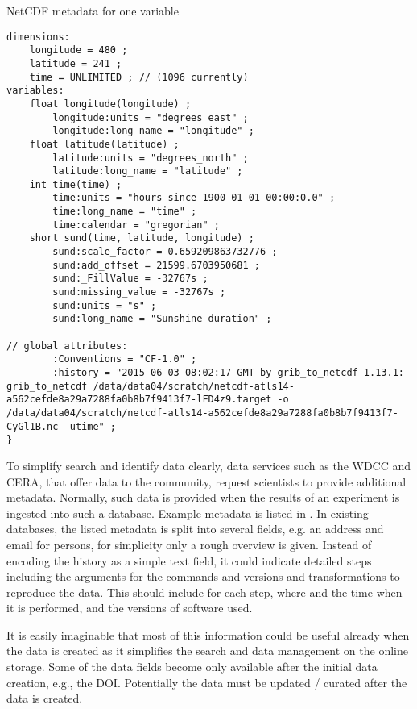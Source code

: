 \begin{tcbcode}[label={lst:NetCDF-data-map}]{NetCDF metadata for one variable}
\begin{lstlisting}
dimensions:
	longitude = 480 ;
	latitude = 241 ;
	time = UNLIMITED ; // (1096 currently)
variables:
	float longitude(longitude) ;
		longitude:units = "degrees_east" ;
		longitude:long_name = "longitude" ;
	float latitude(latitude) ;
		latitude:units = "degrees_north" ;
		latitude:long_name = "latitude" ;
	int time(time) ;
		time:units = "hours since 1900-01-01 00:00:0.0" ;
		time:long_name = "time" ;
		time:calendar = "gregorian" ;
	short sund(time, latitude, longitude) ;
		sund:scale_factor = 0.659209863732776 ;
		sund:add_offset = 21599.6703950681 ;
		sund:_FillValue = -32767s ;
		sund:missing_value = -32767s ;
		sund:units = "s" ;
		sund:long_name = "Sunshine duration" ;

// global attributes:
		:Conventions = "CF-1.0" ;
		:history = "2015-06-03 08:02:17 GMT by grib_to_netcdf-1.13.1: grib_to_netcdf /data/data04/scratch/netcdf-atls14-a562cefde8a29a7288fa0b8b7f9413f7-lFD4z9.target -o /data/data04/scratch/netcdf-atls14-a562cefde8a29a7288fa0b8b7f9413f7-CyGl1B.nc -utime" ;
}
\end{lstlisting}
\end{tcbcode}

To simplify search and identify data clearly, data services such as the WDCC and CERA, that offer data to the community, request scientists to provide additional metadata.
Normally, such data is provided when the results of an experiment is ingested into such a database.
Example metadata is listed in .
In existing databases, the listed metadata is split into several fields, e.g. an address and email for persons, for simplicity only a rough overview is given.
Instead of encoding the history as a simple text field, it could
indicate detailed steps including the arguments for the commands and versions and transformations to reproduce the data.
This should include for each step, where and the time when it is performed, and the versions of software used.

It is easily imaginable that most of this information could be useful already when the data is created as it simplifies the search and data management on the online storage.
Some of the data fields become only available after the initial data creation, e.g., the DOI.
Potentially the data must be updated / curated after the data is created.


